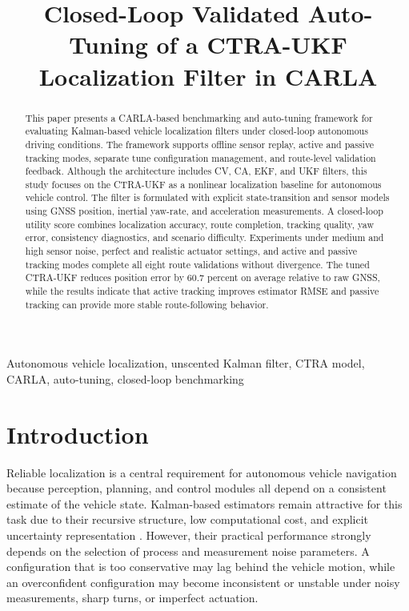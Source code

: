 \documentclass[conference]{IEEEtran}
\begin{document}
\title{Closed-Loop Validated Auto-Tuning of a CTRA-UKF Localization Filter in CARLA}

\author{
}

\maketitle

\begin{abstract}
This paper presents a CARLA-based benchmarking and auto-tuning framework for evaluating Kalman-based vehicle localization filters under closed-loop autonomous driving conditions. The framework supports offline sensor replay, active and passive tracking modes, separate tune configuration management, and route-level validation feedback. Although the architecture includes CV, CA, EKF, and UKF filters, this study focuses on the CTRA-UKF as a nonlinear localization baseline for autonomous vehicle control. The filter is formulated with explicit state-transition and sensor models using GNSS position, inertial yaw-rate, and acceleration measurements. A closed-loop utility score combines localization accuracy, route completion, tracking quality, yaw error, consistency diagnostics, and scenario difficulty. Experiments under medium and high sensor noise, perfect and realistic actuator settings, and active and passive tracking modes complete all eight route validations without divergence. The tuned CTRA-UKF reduces position error by 60.7 percent on average relative to raw GNSS, while the results indicate that active tracking improves estimator RMSE and passive tracking can provide more stable route-following behavior.
\end{abstract}


\begin{IEEEkeywords}
Autonomous vehicle localization, unscented Kalman filter, CTRA model, CARLA, auto-tuning, closed-loop benchmarking
\end{IEEEkeywords}

\section{Introduction}
\label{sec:introduction}

Reliable localization is a central requirement for autonomous vehicle navigation because perception, planning, and control modules all depend on a consistent estimate of the vehicle state. Kalman-based estimators remain attractive for this task due to their recursive structure, low computational cost, and explicit uncertainty representation \cite{kalman1960new,simon2006optimal,barshalom2001estimation}. However, their practical performance strongly depends on the selection of process and measurement noise parameters. A configuration that is too conservative may lag behind the vehicle motion, while an overconfident configuration may become inconsistent or unstable under noisy measurements, sharp turns, or imperfect actuation.
\end{document}
